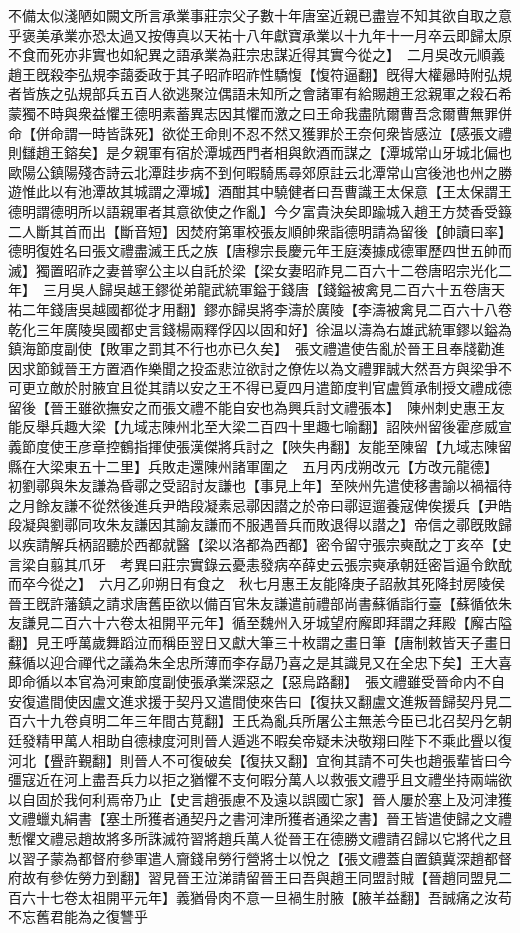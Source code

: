 不備太似淺陋如闕文所言承業事莊宗父子數十年唐室近親已盡豈不知其欲自取之意乎褒美承業亦恐太過又按傳真以天祐十八年獻寶承業以十九年十一月卒云即歸太原不食而死亦非實也如紀異之語承業為莊宗忠謀近得其實今從之】　二月吳改元順義　趙王旣殺李弘規李藹委政于其子昭祚昭祚性驕愎【愎符逼翻】旣得大權曏時附弘規者皆族之弘規部兵五百人欲逃聚泣偶語未知所之會諸軍有給賜趙王忿親軍之殺石希蒙獨不時與衆益懼王德明素蓄異志因其懼而激之曰王命我盡阬爾曹吾念爾曹無罪併命【併命謂一時皆誅死】欲從王命則不忍不然又獲罪於王奈何衆皆感泣【感張文禮則讎趙王鎔矣】是夕親軍有宿於潭城西門者相與飲酒而謀之【潭城常山牙城北偏也歐陽公鎮陽殘杏詩云北潭跬步病不到何暇騎馬尋郊原註云北潭常山宫後池也州之勝遊惟此以有池潭故其城謂之潭城】酒酣其中驍健者曰吾曹識王太保意【王太保謂王德明謂德明所以語親軍者其意欲使之作亂】今夕富貴決矣即踰城入趙王方焚香受籙二人斷其首而出【斷音短】因焚府第軍校張友順帥衆詣德明請為留後【帥讀曰率】德明復姓名曰張文禮盡滅王氏之族【唐穆宗長慶元年王庭湊據成德軍歷四世五帥而滅】獨置昭祚之妻普寧公主以自託於梁【梁女妻昭祚見二百六十二卷唐昭宗光化二年】　三月吳人歸吳越王鏐從弟龍武統軍鎰于錢唐【錢鎰被禽見二百六十五卷唐天祐二年錢唐吳越國都從才用翻】鏐亦歸吳將李濤於廣陵【李濤被禽見二百六十八卷乾化三年廣陵吳國都史言錢楊兩釋俘囚以固和好】徐温以濤為右雄武統軍鏐以鎰為鎮海節度副使【敗軍之罰其不行也亦已久矣】　張文禮遣使告亂於晉王且奉牋勸進因求節鉞晉王方置酒作樂聞之投盃悲泣欲討之僚佐以為文禮罪誠大然吾方與梁爭不可更立敵於肘腋宜且從其請以安之王不得已夏四月遣節度判官盧質承制授文禮成德留後【晉王雖欲撫安之而張文禮不能自安也為興兵討文禮張本】　陳州刺史惠王友能反舉兵趣大梁【九域志陳州北至大梁二百四十里趣七喻翻】詔陜州留後霍彦威宣義節度使王彦章控鶴指揮使張漢傑將兵討之【陜失冉翻】友能至陳留【九域志陳留縣在大梁東五十二里】兵敗走還陳州諸軍圍之　五月丙戌朔改元【方改元龍德】　初劉鄩與朱友謙為昏鄩之受詔討友謙也【事見上年】至陜州先遣使移書諭以禍福待之月餘友謙不從然後進兵尹皓段凝素忌鄩因譛之於帝曰鄩逗遛養寇俾俟援兵【尹皓段凝與劉鄩同攻朱友謙因其諭友謙而不服遇晉兵而敗退得以譛之】帝信之鄩旣敗歸以疾請解兵柄詔聽於西都就醫【梁以洛都為西都】密令留守張宗奭酖之丁亥卒【史言梁自翦其爪牙　考異曰莊宗實錄云憂恚發病卒薛史云張宗奭承朝廷密旨逼令飲酖而卒今從之】　六月乙卯朔日有食之　秋七月惠王友能降庚子詔赦其死降封房陵侯　晉王旣許藩鎮之請求唐舊臣欲以備百官朱友謙遣前禮部尚書蘇循詣行臺【蘇循依朱友謙見二百六十六卷太祖開平元年】循至魏州入牙城望府廨即拜謂之拜殿【廨古隘翻】見王呼萬歲舞蹈泣而稱臣翌日又獻大筆三十枚謂之畫日筆【唐制敕皆天子畫日蘇循以迎合禪代之議為朱全忠所薄而李存勗乃喜之是其識見又在全忠下矣】王大喜即命循以本官為河東節度副使張承業深惡之【惡烏路翻】　張文禮雖受晉命内不自安復遣間使因盧文進求援于契丹又遣間使來告曰【復扶又翻盧文進叛晉歸契丹見二百六十九卷貞明二年三年間古莧翻】王氏為亂兵所屠公主無恙今臣已北召契丹乞朝廷發精甲萬人相助自德棣度河則晉人遁逃不暇矣帝疑未決敬翔曰陛下不乘此舋以復河北【舋許覲翻】則晉人不可復破矣【復扶又翻】宜徇其請不可失也趙張輩皆曰今彊寇近在河上盡吾兵力以拒之猶懼不支何暇分萬人以救張文禮乎且文禮坐持兩端欲以自固於我何利焉帝乃止【史言趙張慮不及遠以誤國亡家】晉人屢於塞上及河津獲文禮蠟丸絹書【塞土所獲者通契丹之書河津所獲者通梁之書】晉王皆遣使歸之文禮慙懼文禮忌趙故將多所誅滅符習將趙兵萬人從晉王在德勝文禮請召歸以它將代之且以習子蒙為都督府參軍遣人齎錢帛勞行營將士以悅之【張文禮蓋自置鎮冀深趙都督府故有參佐勞力到翻】習見晉王泣涕請留晉王曰吾與趙王同盟討賊【晉趙同盟見二百六十七卷太祖開平元年】義猶骨肉不意一旦禍生肘腋【腋羊益翻】吾誠痛之汝苟不忘舊君能為之復讐乎